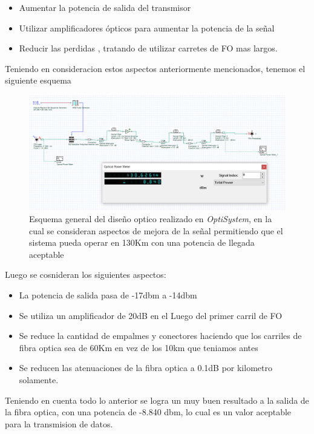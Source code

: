 \begin{enumerate}
\begin{itemize}
	\begin{itemize}
		\item Aumentar la potencia de salida del transmisor
		\item Utilizar amplificadores ópticos para aumentar la potencia de la señal
		\item Reducir las perdidas , tratando de utilizar carretes de FO mas largos.
	\end{itemize}
	Teniendo en consideracion estos aspectos anteriormente mencionados, tenemos el siguiente esquema
	\begin{figure}
		\centering
		\includegraphics[width=0.9\linewidth]{img/P7_5.png}
		\caption{Esquema general del diseño optico realizado en \textit{OptiSystem}, en la cual se consideran aspectos de mejora de la señal permitiendo que el sistema pueda operar en 130Km con una potencia de llegada aceptable}
		\label{fig:imagen1}
	\end{figure}
	Luego se cosnideran los siguientes aspectos:
	\begin{itemize}
		\item La potencia de salida pasa de -17dbm a -14dbm
		\item Se utiliza un amplificador de 20dB en el Luego del primer carril de FO
		\item Se reduce la cantidad de empalmes y conectores haciendo que los carriles de fibra optica sea de 60Km en vez de los 10km que teniamos antes 
		\item Se reducen las atenuaciones de la fibra optica a 0.1dB por kilometro solamente.
	\end{itemize}
	Teniendo en cuenta todo lo anterior se logra un muy buen resultado a la salida de la fibra optica, con una potencia de -8.840 dbm, lo cual es un valor aceptable para la transmision de datos.
\end{itemize}

\end{enumerate}